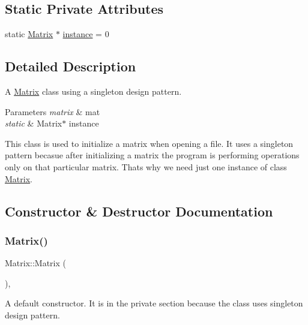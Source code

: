 \subsection*{Static Private Attributes}
\begin{DoxyCompactItemize}
\item 
static \hyperlink{class_matrix}{Matrix} $\ast$ \hyperlink{class_matrix_adbe13eefa6a6ea2f02f45da26400f22e}{instance} = 0
\end{DoxyCompactItemize}


\subsection{Detailed Description}
A \hyperlink{class_matrix}{Matrix} class using a singleton design pattern. 


\begin{DoxyParams}{Parameters}
{\em matrix} & mat \\
\hline
{\em static} & Matrix$\ast$ instance\\
\hline
\end{DoxyParams}
This class is used to initialize a matrix when opening a file. It uses a singleton pattern becasue after initializing a matrix the program is performing operations only on that particular matrix. That\textquotesingle{}s why we need just one instance of class \hyperlink{class_matrix}{Matrix}. 

\subsection{Constructor \& Destructor Documentation}
\mbox{\label{class_matrix_a2dba13c45127354c9f75ef576f49269b}} 
\subsubsection{\texorpdfstring{Matrix()}{Matrix()}\hspace{0.1cm}{\footnotesize\ttfamily [1/2]}}
{\footnotesize\ttfamily Matrix\+::\+Matrix (\begin{DoxyParamCaption}{ }\end{DoxyParamCaption})\hspace{0.3cm}{\ttfamily [inline]}, {\ttfamily [private]}}

A default constructor. It is in the private section because the class uses singleton design pattern. \mbox{\label{class_matrix_abc64f3d5a4f22323a24be2bfabf377cb}} 
